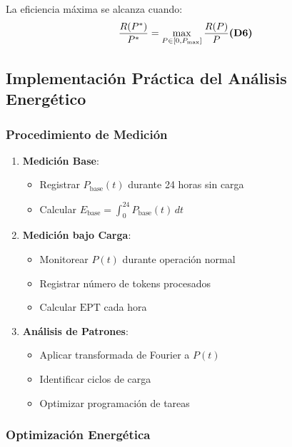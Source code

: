 \begin{corolario}
La eficiencia máxima se alcanza cuando:
\begin{equation}
    \frac{R(P^*)}{P^*} = \max_{P \in [0,P_{\text{max}}]} \frac{R(P)}{P} \textbf{(D6)}
\end{equation}
\end{corolario}

\subsection{Implementación Práctica del Análisis Energético}

\subsubsection{Procedimiento de Medición}

\begin{enumerate}
    \item \textbf{Medición Base}:
        \begin{itemize}
            \item Registrar $P_{\text{base}}(t)$ durante 24 horas sin carga
            \item Calcular $E_{\text{base}} = \int_{0}^{24} P_{\text{base}}(t)\,dt$
        \end{itemize}
    
    \item \textbf{Medición bajo Carga}:
        \begin{itemize}
            \item Monitorear $P(t)$ durante operación normal
            \item Registrar número de tokens procesados
            \item Calcular $\text{EPT}$ cada hora
        \end{itemize}
    
    \item \textbf{Análisis de Patrones}:
        \begin{itemize}
            \item Aplicar transformada de Fourier a $P(t)$
            \item Identificar ciclos de carga
            \item Optimizar programación de tareas
        \end{itemize}
\end{enumerate}

\subsubsection{Optimización Energética}

